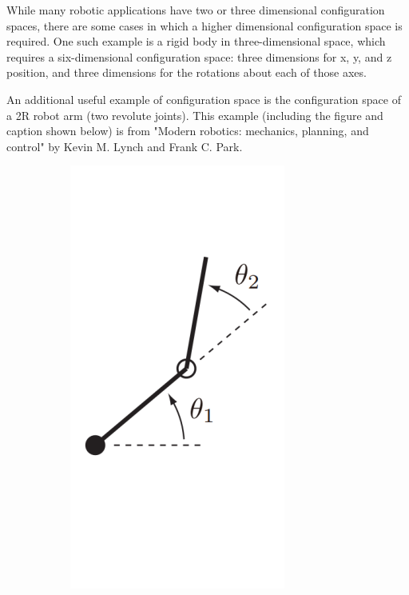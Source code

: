 \documentclass[twoside]{article}
\begin{document}
While many robotic applications have two or three dimensional configuration spaces, there are some cases in which a higher dimensional configuration space is required.  One such example is a rigid body in three-dimensional space, which requires a six-dimensional configuration space: three dimensions for x, y, and z position, and three dimensions for the rotations about each of those axes.

An additional useful example of configuration space is the configuration space of a 2R robot arm (two revolute joints). This example (including the figure and caption shown below) is from "Modern robotics: mechanics, planning, and control" by Kevin M. Lynch and Frank C. Park.
\begin{figure}[H]
\centering
\begin{subfigure}[t]{0.20\textwidth}
\centering
\includegraphics[width=\columnwidth]{ConfigSpaceDiff1.png}

\end{subfigure}
\end{figure}
\end{document}
